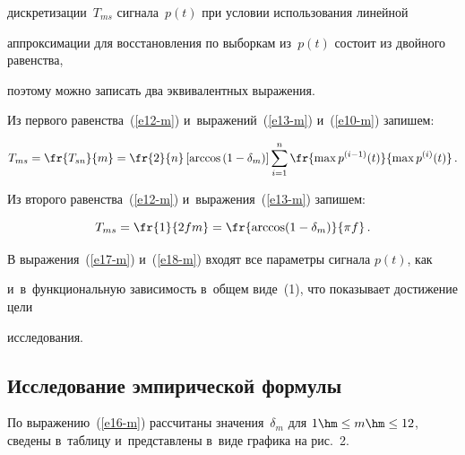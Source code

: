 дискретизации~$T_{ms}$ сигнала~$p(t)$ при условии использования линейной 


аппроксимации для восстановления по выборкам из~$p(t)$ состоит из двойного равенства, 


поэтому можно записать два эквивалентных выражения.


  


  Из первого равенства~(\ref{e12-m}) и~выражений~(\ref{e13-m}) и~(\ref{e10-m}) запишем:


  \begin{equation}


  T_{ms}=\fr{T_{sn}}{m} =\fr{2}{n}\left[ \arccos \left( 1-\delta_m\right) \right] 


\sum\limits^n_{i=1} \fr{\max p^{(i-1)}(t)}{\max p^{(i)}(t)}\,.


  \label{e17-m}


  \end{equation}


  


  Из второго равенства~(\ref{e12-m}) и~выражения~(\ref{e13-m}) запишем:


  \begin{equation}


  T_{ms}=\fr{1}{2fm}=\fr{\arccos (1-\delta_m)}{\pi f}\,.


  \label{e18-m}


  \end{equation}


  


  В выражения~(\ref{e17-m}) и~(\ref{e18-m}) входят все параметры сигнала $p(t)$, как 


и~в~функциональную зависимость в~общем виде~(1), что показывает достижение цели 


исследования.


  


  \subsection{Исследование эмпирической формулы {}} %


  


  По выражению~(\ref{e16-m}) рассчитаны значения~$\delta_m$ для $1\hm\leq m\hm\leq 


12$, сведены в~таблицу и~представлены в~виде графика на рис.~2.


